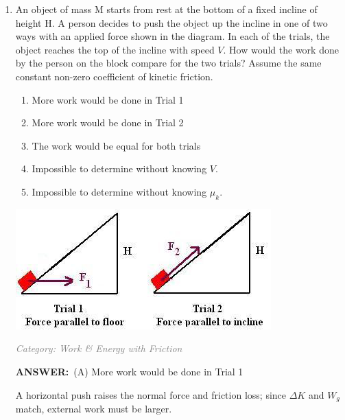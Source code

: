 \documentclass[12pt, a4paper]{article}
\makeatletter
\newcommand{\finalanswer}[1]{\textbf{ANSWER:}~#1}
\newif\if@categoryprinted
\newcommand{\category}[1]{\if@categoryprinted\relax\else\textit{\textcolor{gray}{Category: #1}}\global\@categoryprintedtrue\fi}
\newcommand{\tags}[1]{}
\makeatother
\begin{document}
\begin{CJK*}{UTF8}{gbsn}
\begin{enumerate}[itemsep=1.0em, topsep=0.6em]
\item \label{prob:14}
\noindent\begin{minipage}[t]{0.6\linewidth}
\vspace{0pt}
An object of mass M starts from rest at the bottom of a fixed incline of height H. A person decides to push the object up the incline in one of two ways with an applied force shown in the diagram. In each of the trials, the object reaches the top of the incline with speed $V$. How would the work done by the person on the block compare for the two trials? Assume the same constant non-zero coefficient of kinetic friction.
\begin{enumerate}[label=(\Alph*)]
    \item More work would be done in Trial 1
    \item More work would be done in Trial 2
    \item The work would be equal for both trials
    \item Impossible to determine without knowing $V$.
    \item Impossible to determine without knowing $\mu_k$.
\end{enumerate}
\end{minipage}%
\hfill
\begin{minipage}[t]{0.35\linewidth}
\vspace{0pt}
\centering
\includegraphics[width=\linewidth]{Problem_14_Figure.png}
\end{minipage}

\category{Work \& Energy with Friction} \tags{}
\begin{answerbox}
\finalanswer{(A) More work would be done in Trial 1}
\end{answerbox}
\begin{insightbox}
A horizontal push raises the normal force and friction loss; since $\Delta K$ and $W_g$ match, external work must be larger.
\end{insightbox}
\begin{solutionbox}


\end{solutionbox}
\end{enumerate}
\end{CJK*}
\end{document}
